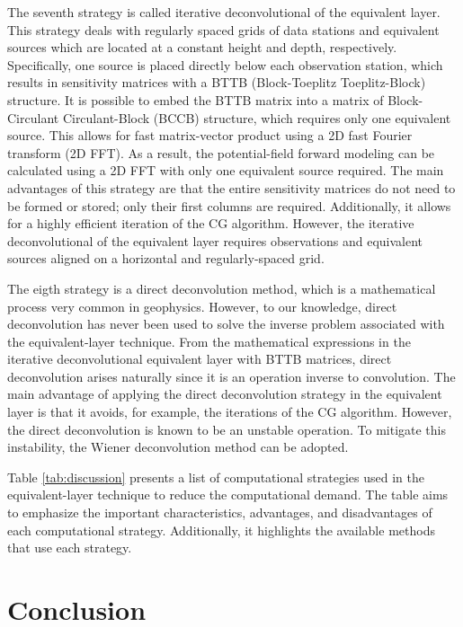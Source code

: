 \documentclass[utf8]{FrontiersinHarvard} %
\begin{document}
	
	The seventh strategy is called iterative deconvolutional of the equivalent layer.
	This strategy deals with regularly spaced grids of data stations and equivalent sources which are located at a constant height and depth, respectively. 
	Specifically, one source is placed directly below each observation station, which results in sensitivity matrices with a BTTB (Block-Toeplitz Toeplitz-Block) structure. 
	It is possible to embed the BTTB matrix into a matrix of Block-Circulant Circulant-Block (BCCB) structure, which requires only one equivalent source. 
	This allows for fast matrix-vector product using a 2D fast Fourier transform (2D FFT). 
	As a result, the potential-field forward modeling can be calculated using 
	a 2D FFT with only one equivalent source required. 
	The main advantages of this strategy are that the entire sensitivity matrices do not need to be formed or stored; only their first columns are required. Additionally, it allows for a highly efficient iteration of the CG algorithm.
	However, the iterative deconvolutional of the equivalent layer requires 
	observations and equivalent sources aligned on a horizontal and regularly-spaced grid.
	
	The eigth strategy is a direct deconvolution method, which is a mathematical process very common in geophysics. 
	However, to our knowledge, direct deconvolution has never been used to solve the inverse problem associated with the equivalent-layer technique. 
	From the mathematical expressions in the iterative deconvolutional equivalent layer with BTTB matrices, direct deconvolution arises naturally since it is an operation inverse to convolution. 
	The main advantage of applying the direct deconvolution strategy in the equivalent layer is that it avoids, for example, the  iterations of the CG algorithm. 
	However, the direct deconvolution is known to be an unstable operation.
	To mitigate this instability, the Wiener deconvolution method can be adopted.
	
	Table \ref{tab:discussion} presents a list of computational strategies used in the equivalent-layer technique to reduce the computational demand.
	The table aims to emphasize the important characteristics, advantages, and disadvantages of each computational strategy. 
	Additionally, it highlights the available methods that use each strategy.
	
	\section{Conclusion}
	
\end{document}
